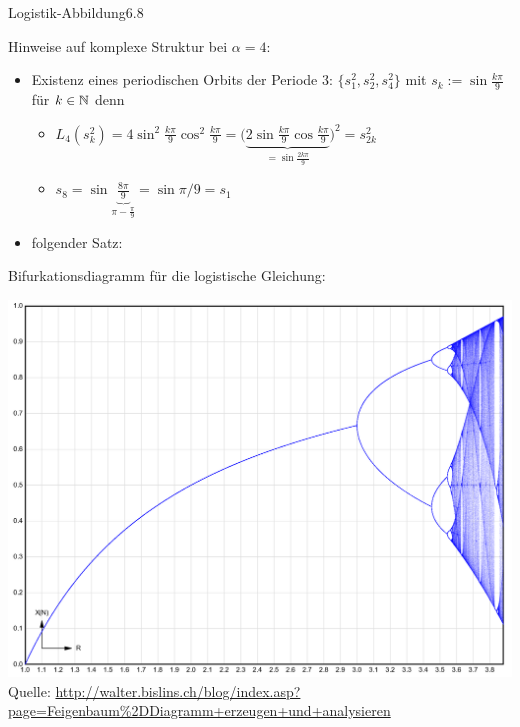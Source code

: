 \documentclass[a4paper]{article}
\begin{document}
\begin{Beispiel}{Logistik-Abbildung}{6.8}

Hinweise auf komplexe Struktur bei $\alpha=4$:
\begin{itemize}
\item Existenz eines periodischen Orbits der Periode 3: $\{s_1^2,s_2^2,s_4^2\}$ mit $s_k:=\sin \frac{k\pi}{9}$ für $k\in\operatorname{\mathbb N}$ denn
\begin{itemize}
\item $L_4(s_k^2)=4\sin^2\frac{k\pi}{9}\cos^2\frac{k\pi}{9}=
\big(\underbrace{2\sin\frac{k\pi}{9}\cos\frac{k\pi}{9}}_{=\sin\frac{2k\pi}{9}}\big)^2=s_{2k}^2$
\item $s_8=\sin\underbrace{\frac{8\pi}{9}}_{\pi-\frac{\pi}{9}}=\sin\pi/9=s_1$
\end{itemize}
\item folgender Satz:
\end{itemize}

Bifurkationsdiagramm für die logistische Gleichung:
\begin{center}
\includegraphics[scale=0.25]{Bilder/Feigenbaumdiagramm}\\
Quelle: \url{http://walter.bislins.ch/blog/index.asp?page=Feigenbaum%2DDiagramm+erzeugen+und+analysieren}
\end{center}

\end{Beispiel}
\end{document}
